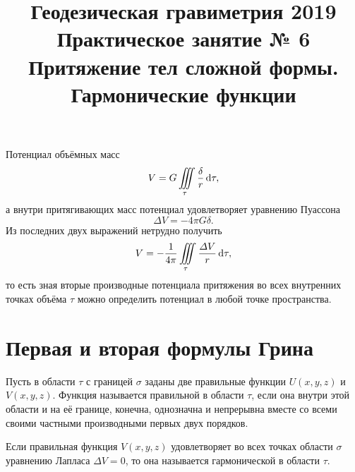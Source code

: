 \documentclass[11pt, a4paper]{article}
\title{{\Large Геодезическая гравиметрия 2019}\\ 
    {\bf\Large Практическое занятие № 6} \\
{\Large Притяжение тел сложной формы. Гармонические функции}}
\author{}
\date{\DTMusedate{lessondate}}
\theoremstyle{plain}
\theoremstyle{definition}
\theoremstyle{remark}
\begin{document}
\maketitle

Потенциал объёмных масс
\begin{equation}
    V = G\iiint\limits_\tau \dfrac{\delta}{r}\dif \tau,
\end{equation}
а внутри притягивающих масс потенциал удовлетворяет уравнению Пуассона
\begin{equation}
    \label{eq:poisson}
    \Delta V = -4\pi G\delta.
\end{equation}
Из последних двух выражений нетрудно получить
\begin{equation}
    \label{eq:poissonvol}
    V = -\dfrac{1}{4\pi}\iiint\limits_\tau \dfrac{\Delta V}{r} \dif\tau,
\end{equation}
то есть зная вторые производные потенциала притяжения во всех внутренних точках объёма $\tau$ можно
определить потенциал в любой точке пространства.

\section{Первая и вторая формулы Грина}
Пусть в области $\tau$ с границей $\sigma$ заданы две правильные функции $U\left( x, y, z \right)$ и
$V \left( x, y, z \right)$. Функция называется правильной в области $\tau$, если она внутри этой
области и на её границе, конечна, однозначна и непрерывна вместе со всеми своими частными
производными первых двух порядков. \par

Если правильная функция $V \left( x, y, z \right)$ удовлетворяет во всех точках области $\sigma$
уравнению Лапласа $\Delta V = 0$, то она называется гармонической в области $\tau$. 
\end{document}
